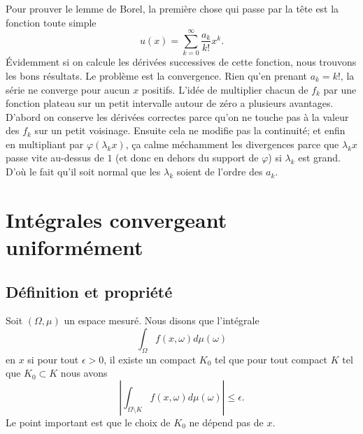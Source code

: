 \begin{remark}
    Pour prouver le lemme de Borel, la première chose qui passe par la tête est la fonction toute simple
    \begin{equation}
        u(x)=\sum_{k=0}^{\infty}\frac{ a_k }{ k! }x^k.
    \end{equation}
    Évidemment si on calcule les dérivées successives de cette fonction, nous trouvons les bons résultats. Le problème est la convergence.  Rien qu'en prenant \( a_k=k!\), la série ne converge pour aucun \( x\) positifs. L'idée de multiplier chacun de \( f_k\) par une fonction plateau sur un petit intervalle autour de zéro a plusieurs avantages. D'abord on conserve les dérivées correctes parce qu'on ne touche pas à la valeur des \( f_k\) sur un petit voisinage. Ensuite cela ne modifie pas la continuité; et enfin en multipliant par \( \varphi(\lambda_kx)\), ça calme méchamment les divergences parce que \( \lambda_kx\) passe vite au-dessus de \( 1\) (et donc en dehors du support de \( \varphi\)) si \( \lambda_k\) est grand. D'où le fait qu'il soit normal que les \( \lambda_k\) soient de l'ordre des \( a_k\).
\end{remark}

\section{Intégrales convergeant uniformément}

\subsection{Définition et propriété}

Soit \( (\Omega,\mu)\) un espace mesuré. Nous disons que l'intégrale
\begin{equation}
    \int_{\Omega}f(x,\omega)d\mu(\omega)
\end{equation}
 en \( x\) si pour tout \( \epsilon>0\), il existe un compact \( K_0\) tel que pour tout compact \( K\) tel que \( K_0\subset K\) nous avons
\begin{equation}
    \left| \int_{\Omega\setminus K}f(x,\omega)d\mu(\omega) \right| \leq \epsilon.
\end{equation}
Le point important est que le choix de \( K_0\) ne dépend pas de \( x\).

